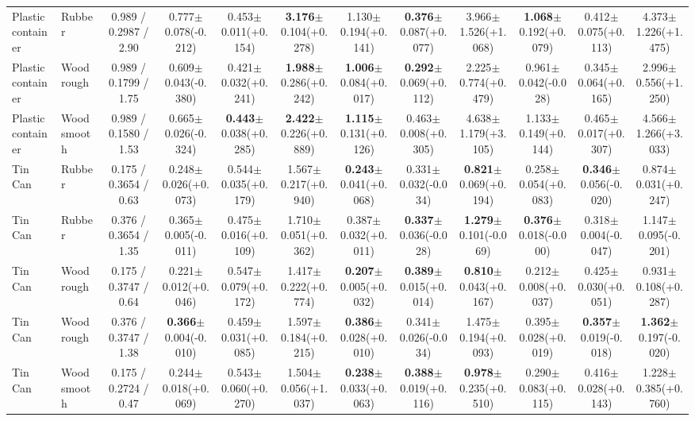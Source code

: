 \begin{table}[t]
{\begin{tabular}{l l c c c c c c c c c c }
        Plastic container & Rubber & 0.989 / 0.2987 / 2.90 & 0.777$\pm$0.078(-0.212) & 0.453$\pm$0.011(+0.154) & \textbf{3.176}$\pm$0.104(+0.278) & 1.130$\pm$0.194(+0.141) & \textbf{0.376}$\pm$0.087(+0.077) & 3.966$\pm$1.526(+1.068) & \textbf{1.068}$\pm$0.192(+0.079) & 0.412$\pm$0.075(+0.113) & 4.373$\pm$1.226(+1.475) \\
        Plastic container & Wood rough & 0.989 / 0.1799 / 1.75 & 0.609$\pm$0.043(-0.380) & 0.421$\pm$0.032(+0.241) & \textbf{1.988}$\pm$0.286(+0.242) & \textbf{1.006}$\pm$0.084(+0.017) & \textbf{0.292}$\pm$0.069(+0.112) & 2.225$\pm$0.774(+0.479) & 0.961$\pm$0.042(-0.028) & 0.345$\pm$0.064(+0.165) & 2.996$\pm$0.556(+1.250) \\
        Plastic container & Wood smooth & 0.989 / 0.1580 / 1.53 & 0.665$\pm$0.026(-0.324) & \textbf{0.443}$\pm$0.038(+0.285) & \textbf{2.422}$\pm$0.226(+0.889) & \textbf{1.115}$\pm$0.131(+0.126) & 0.463$\pm$0.008(+0.305) & 4.638$\pm$1.179(+3.105) & 1.133$\pm$0.149(+0.144) & 0.465$\pm$0.017(+0.307) & 4.566$\pm$1.266(+3.033) \\
        Tin Can & Rubber & 0.175 / 0.3654 / 0.63 & 0.248$\pm$0.026(+0.073) & 0.544$\pm$0.035(+0.179) & 1.567$\pm$0.217(+0.940) & \textbf{0.243}$\pm$0.041(+0.068) & 0.331$\pm$0.032(-0.034) & \textbf{0.821}$\pm$0.069(+0.194) & 0.258$\pm$0.054(+0.083) & \textbf{0.346}$\pm$0.056(-0.020) & 0.874$\pm$0.031(+0.247) \\
        Tin Can & Rubber & 0.376 / 0.3654 / 1.35 & 0.365$\pm$0.005(-0.011) & 0.475$\pm$0.016(+0.109) & 1.710$\pm$0.051(+0.362) & 0.387$\pm$0.032(+0.011) & \textbf{0.337}$\pm$0.036(-0.028) & \textbf{1.279}$\pm$0.101(-0.069) & \textbf{0.376}$\pm$0.018(-0.000) & 0.318$\pm$0.004(-0.047) & 1.147$\pm$0.095(-0.201) \\
        Tin Can & Wood rough & 0.175 / 0.3747 / 0.64 & 0.221$\pm$0.012(+0.046) & 0.547$\pm$0.079(+0.172) & 1.417$\pm$0.222(+0.774) & \textbf{0.207}$\pm$0.005(+0.032) & \textbf{0.389}$\pm$0.015(+0.014) & \textbf{0.810}$\pm$0.043(+0.167) & 0.212$\pm$0.008(+0.037) & 0.425$\pm$0.030(+0.051) & 0.931$\pm$0.108(+0.287) \\
        Tin Can & Wood rough & 0.376 / 0.3747 / 1.38 & \textbf{0.366}$\pm$0.004(-0.010) & 0.459$\pm$0.031(+0.085) & 1.597$\pm$0.184(+0.215) & \textbf{0.386}$\pm$0.028(+0.010) & 0.341$\pm$0.026(-0.034) & 1.475$\pm$0.194(+0.093) & 0.395$\pm$0.028(+0.019) & \textbf{0.357}$\pm$0.019(-0.018) & \textbf{1.362}$\pm$0.197(-0.020) \\
        Tin Can & Wood smooth & 0.175 / 0.2724 / 0.47 & 0.244$\pm$0.018(+0.069) & 0.543$\pm$0.060(+0.270) & 1.504$\pm$0.056(+1.037) & \textbf{0.238}$\pm$0.033(+0.063) & \textbf{0.388}$\pm$0.019(+0.116) & \textbf{0.978}$\pm$0.235(+0.510) & 0.290$\pm$0.083(+0.115) & 0.416$\pm$0.028(+0.143) & 1.228$\pm$0.385(+0.760) \\

\end{tabular}}
\end{table}
